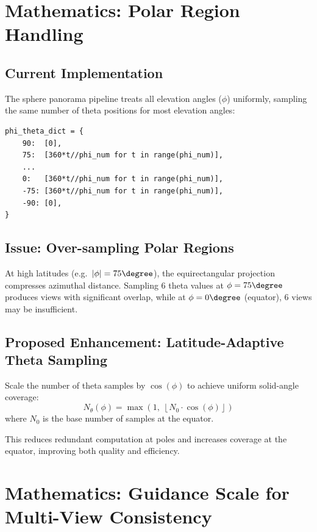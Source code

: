 \documentclass[11pt,a4paper]{article}
\begin{document}
\section{Mathematics: Polar Region Handling}

\subsection{Current Implementation}

The sphere panorama pipeline treats all elevation angles ($\phi$) uniformly, sampling the same number of theta positions for most elevation angles:
\begin{lstlisting}
phi_theta_dict = {
    90:  [0],
    75:  [360*t//phi_num for t in range(phi_num)],
    ...
    0:   [360*t//phi_num for t in range(phi_num)],
    -75: [360*t//phi_num for t in range(phi_num)],
    -90: [0],
}
\end{lstlisting}

\subsection{Issue: Over-sampling Polar Regions}

At high latitudes (e.g.\ $|\phi| = 75\degree$), the equirectangular projection compresses azimuthal distance.
Sampling 6 theta values at $\phi = 75\degree$ produces views with significant overlap, while at $\phi = 0\degree$ (equator), 6 views may be insufficient.

\subsection{Proposed Enhancement: Latitude-Adaptive Theta Sampling}

Scale the number of theta samples by $\cos(\phi)$ to achieve uniform solid-angle coverage:
\begin{equation}
    N_\theta(\phi) = \max\left(1, \; \left\lfloor N_0 \cdot \cos(\phi) \right\rfloor\right)
\end{equation}
where $N_0$ is the base number of samples at the equator.

This reduces redundant computation at poles and increases coverage at the equator, improving both quality and efficiency.

\section{Mathematics: Guidance Scale for Multi-View Consistency}
\end{document}
